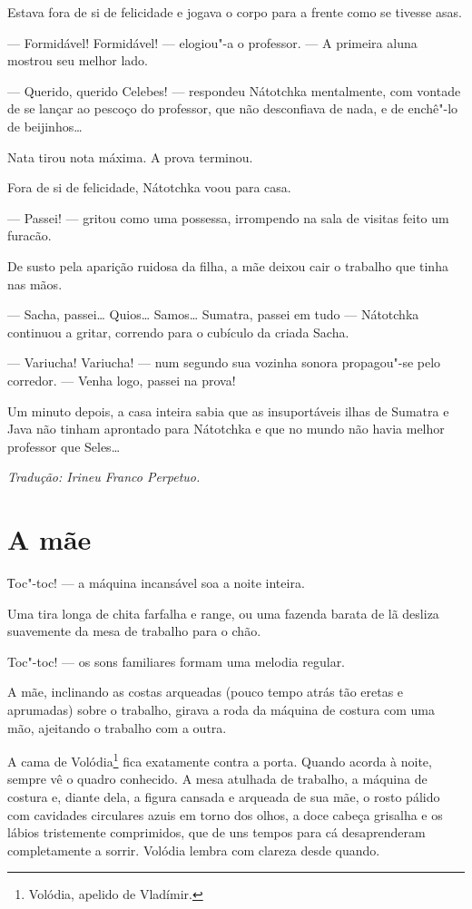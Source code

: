 Estava fora de si de felicidade e jogava o corpo para a frente como se
tivesse asas.

--- Formidável! Formidável! --- elogiou"-a o professor. --- A primeira
aluna mostrou seu melhor lado.

--- Querido, querido Celebes! --- respondeu Nátotchka mentalmente, com
vontade de se lançar ao pescoço do professor, que não desconfiava de
nada, e de enchê"-lo de beijinhos\ldots{}

Nata tirou nota máxima. A prova terminou.

Fora de si de felicidade, Nátotchka voou para casa.

--- Passei! --- gritou como uma possessa, irrompendo na sala de visitas
feito um furacão.

De susto pela aparição ruidosa da filha, a mãe deixou cair o trabalho
que tinha nas mãos.

--- Sacha, passei\ldots{} Quios\ldots{} Samos\ldots{} Sumatra, passei em tudo ---
Nátotchka continuou a gritar, correndo para o cubículo da criada Sacha.

--- Variucha! Variucha! --- num segundo sua vozinha sonora propagou"-se
pelo corredor. --- Venha logo, passei na prova!

Um minuto depois, a casa inteira sabia que as insuportáveis ilhas de
Sumatra e Java não tinham aprontado para Nátotchka e que no mundo não
havia melhor professor que Seles\ldots{}

\medskip

{\footnotesize\hfill\emph{Tradução: Irineu Franco Perpetuo.}}

\chapter{A mãe} \label{part13}

Тoc"-toc! --- a máquina incansável soa a noite inteira.

Uma tira longa de chita farfalha e range, ou uma fazenda barata de lã
desliza suavemente da mesa de trabalho para o chão.

Toc"-toc! --- os sons familiares formam uma melodia regular.

A mãe, inclinando as costas arqueadas (pouco tempo atrás tão eretas e
aprumadas) sobre o trabalho, girava a roda da máquina de costura com uma
mão, ajeitando o trabalho com a outra.

A cama de Volódia\footnote{Volódia, apelido de Vladímir.} fica
exatamente contra a porta. Quando acorda à noite, sempre vê o quadro
conhecido. A mesa atulhada de trabalho, a máquina de costura e, diante
dela, a figura cansada e arqueada de sua mãe, o rosto pálido com
cavidades circulares azuis em torno dos olhos, a doce cabeça grisalha e
os lábios tristemente comprimidos, que de uns tempos para cá
desaprenderam completamente a sorrir. Volódia lembra com clareza desde
quando.

